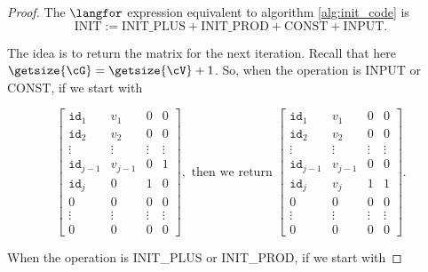 \begin{proof}
The $\langfor$ expression equivalent to algorithm \ref{alg:init_code} is $$\text{INIT}:=\text{INIT{\_}PLUS}+\text{INIT{\_}PROD}+\text{CONST}+\text{INPUT}.$$

The idea is to return the matrix for the next iteration. Recall that here $\getsize{\cG}=\getsize{\cV} + 1$. So, when the operation is INPUT or CONST, if we start with

\[
\begin{bmatrix}
    \texttt{id}_1 & v_1 & 0 & 0 \\
    \texttt{id}_2 & v_2 & 0 & 0 \\
    \vdots & \vdots & \vdots & \vdots \\
    \texttt{id}_{j-1} & v_{j-1} & 0 & 1 \\
    \texttt{id}_j & 0 & 1 & 0 \\
    0 & 0 & 0 & 0 \\
    \vdots & \vdots & \vdots & \vdots \\
     0 & 0 & 0 & 0
\end{bmatrix}, \text{ then we return }
\begin{bmatrix}
    \texttt{id}_1 & v_1 & 0 & 0 \\
    \texttt{id}_2 & v_2 & 0 & 0 \\
    \vdots & \vdots & \vdots & \vdots \\
    \texttt{id}_{j-1} & v_{j-1} & 0 & 0 \\
    \texttt{id}_j & v_j & 1 & 1 \\
    0 & 0 & 0 & 0 \\
    \vdots & \vdots & \vdots & \vdots \\
     0 & 0 & 0 & 0
\end{bmatrix}.
\]

When the operation is INIT{\_}PLUS or INIT{\_}PROD, if we start with 


\end{proof}
